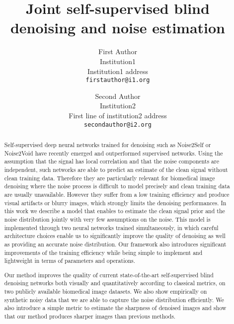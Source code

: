 \documentclass[review]{cvpr}
\begin{document}
\title{Joint self-supervised blind denoising and noise estimation}

\author{First Author\\
Institution1\\
Institution1 address\\
{\tt\small firstauthor@i1.org}
\and
Second Author\\
Institution2\\
First line of institution2 address\\
{\tt\small secondauthor@i2.org}
}

\maketitle


\begin{abstract}
Self-supervised deep neural networks trained for denoising such as Noise2Self or Noise2Void have recently emerged and outperformed supervised networks. Using the assumption that the signal has local correlation and that the noise components are independent, such networks are able to predict an estimate of the clean signal without clean training data. Therefore they are particularly relevant for biomedical image denoising where the noise process is difficult to model precisely and clean training data are usually unavailable. However they suffer from a low training efficiency and produce visual artifacts or blurry images, which strongly limits the denoising performances.
In this work we describe a model that enables to estimate the clean signal prior and the noise distribution jointly with very few assumptions on the noise. This model is implemented through two neural networks trained simultaneously, in which careful architecture choices enable us to significantly improve the quality of denoising as well as providing an accurate noise distribution. Our framework also introduces significant improvements of the training efficiency while being simple to implement and lightweight in terms of parameters and operations.

Our method improves the quality of current state-of-the-art self-supervised blind denoising networks both visually and quantitatively according to classical metrics, on two publicly available biomedical image datasets. We also show empirically on synthetic noisy data that we are able to capture the noise distribution efficiently. We also introduce a simple metric to estimate the sharpness of denoised images and show that our method produces sharper images than previous methods.
\end{abstract}
\end{document}

